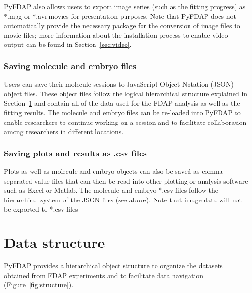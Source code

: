 \documentclass[a4paper,11pt]{article}
\begin{document}
PyFDAP also allows users to export image series (such as the fitting progress) as *.mpg or *.avi movies for presentation purposes. Note that PyFDAP does not automatically provide the necessary package for the conversion of image files to movie files; more information about the installation process to enable video output can be found in Section~\ref{sec:video}.

\subsubsection{Saving molecule and embryo files}
Users can save their molecule sessions to JavaScript Object Notation (JSON) object files. These object files follow the logical hierarchical structure explained in Section~\ref{sec:structure} and contain all of the data used for the FDAP analysis as well as the fitting results. The molecule and embryo files can be re-loaded into PyFDAP to enable researchers to continue working on a session and to facilitate collaboration among researchers in different locations.

\subsubsection{Saving plots and results as .csv files}
Plots as well as molecule and embryo objects can also be saved as comma-separated value files that can then be read into other plotting or analysis software such as Excel or Matlab. The molecule and embryo *.csv files follow the hierarchical system of the JSON files (see above). Note that image data will not be exported to *.csv files.

\section{Data structure}
\label{sec:structure}
PyFDAP provides a hierarchical object structure to organize the datasets obtained from FDAP experiments and to facilitate data navigation (Figure~\ref{fig:structure}).
\end{document}
